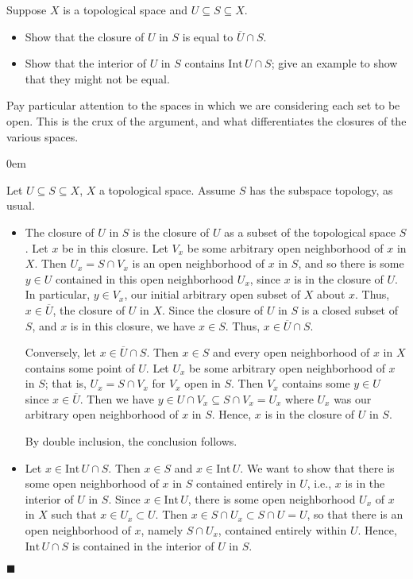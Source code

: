\documentclass[12pt]{article}
\renewcommand{\qed}{\hfill$\blacksquare$}
\renewenvironment{proof}{\begin{addmargin}[1em]{0em}\begin{newproof}}{\end{newproof}\end{addmargin}\qed}
\newenvironment{exercise}[2][Exercise]{\begin{trivlist}
\item[\hskip \labelsep {\bfseries #1}\hskip \labelsep {\bfseries #2.}]}{\end{trivlist}}
\begin{document}
\begin{exercise}{3.7}
Suppose $X$ is a topological space and $U\subseteq S \subseteq X$.
\begin{itemize}
	\item Show that the closure of $U$ in $S$ is equal to $\overline{U}\cap S$.
	\item Show that the interior of $U$ in $S$ contains $\text{Int}\, U \cap S$; give an example to show that they might not be equal.
\end{itemize}
\end{exercise}
{\color{red} Pay particular attention to the spaces in which we are considering each set to be open. This is the crux of the argument, and what differentiates the closures of the various spaces. }\\
\begin{proof}
Let $U\subseteq S \subseteq X$, $X$ a topological space. {\color{red} Assume $S$ has the subspace topology, as usual.}
\begin{itemize}
	\item The closure of $U$ in $S$ is the closure of $U$ as a subset of the topological space $S$. Let $x$ be in this closure. Let $V_x$ be some arbitrary open neighborhood of $x$ in $X$. Then $U_x = S\cap V_x$ is an open neighborhood of $x$ in $S$, and so there is some $y \in U$ contained in this open neighborhood $U_x$, since $x$ is in the closure of $U$. In particular, $y \in V_x$, our initial arbitrary open subset of $X$ about $x$. Thus, $x \in \overline{U}$, the closure of $U$ in $X$. Since the closure of $U$ in $S$ is a closed subset of $S$, and $x$ is in this closure, we have $x\in S$. Thus, $x\in \overline{U}\cap S$.

	Conversely, let $x\in \overline{U}\cap S$. Then $x\in S$ and every open neighborhood of $x$ in $X$ contains some point of $U$. Let $U_x$ be some arbitrary open neighborhood of $x$ in $S$; that is, $U_x = S\cap V_x$ for $V_x$ open in $S$. Then $V_x$ contains some $y\in U$ since $x \in \overline{U}$. Then we have $y \in U\cap V_x \subseteq S\cap V_x = U_x$ where $U_x$ was our arbitrary open neighborhood of $x$ in $S$. Hence, $x$ is in the closure of $U$ in $S$.

	By double inclusion, the conclusion follows.

	\item Let $x \in \text{Int}\, U\cap S$. Then $x\in S$ and $x\in \text{Int}\, U$.  We want to show that there is some open neighborhood of $x$ in $S$ contained entirely in $U$, i.e., $x$ is in the interior of $U$ in $S$. Since $x \in \text{Int}\, U$, there is some open neighborhood $U_x$ of $x$ in $X$ such that $x\in U_x \subset U$. Then $x \in S\cap U_x \subset S\cap U = U $, so that there is an open neighborhood of $x$, namely $S\cap U_x$, contained entirely within $U$. Hence, $\text{Int}\, U \cap S$ is contained in the interior of $U$ in $S$.


\end{itemize}
\end{proof}
\end{document}
